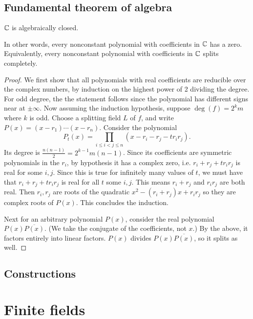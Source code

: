 \section{Fundamental theorem of algebra}
\begin{thm}
$\mathbb{C}$ is algebraically closed.
\end{thm}
In other words, every nonconstant polynomial with coefficients in $\mathbb{C}$ has a zero. Equivalently, every nonconstant polynomial with coefficients in $\mathbb{C}$ splits completely.
\begin{proof}
We first show that all polynomials with real coefficients are reducible over the complex numbers, by induction on the highest power of 2 dividing the degree. For odd degree, the the statement follows since the polynomial has different signs near at $ \pm \infty$. Now assuming the induction hypothesis, suppose $ \deg(f)=2^km$ where $ k$ is odd. Choose a splitting field $ L$ of $ f$, and write $ P(x)=(x-r_1)\cdots (x-r_n)$. Consider the polynomial
\[P_t(x)=\prod_{i\leq i<j\leq n}(x-r_i-r_j-tr_ir_j).\]
Its degree is $ \frac{n(n-1)}{2}=2^{k-1}m(n-1)$. Since its coefficients are symmetric polynomials in the $ r_i$, by hypothesis it has a complex zero, i.e. $ r_i+r_j+tr_ir_j$ is real for some $ i,j$. Since this is true for infinitely many values of $ t$, we must have that $ r_i+r_j+tr_ir_j$ is real for all $ t$ some $ i,j$. This means $ r_i+r_j$ and $ r_ir_j$ are both real. Then $ r_i,r_j$ are roots of the quadratic $ x^2-(r_i+r_j)x+r_ir_j$ so they are complex roots of $ P(x)$. This concludes the induction.

Next for an arbitrary polynomial $ P(x)$, consider the real polynomial $ P(x) \overline{P(x)}$. (We take the conjugate of the coefficients, not $ x$.) By the above, it factors entirely into linear factors. $ P(x)$ divides $ P(x) \overline{P(x)}$, so it splits as well.
\end{proof}
\section{Constructions}
\chapter{Finite fields}\label{finite-fields}
